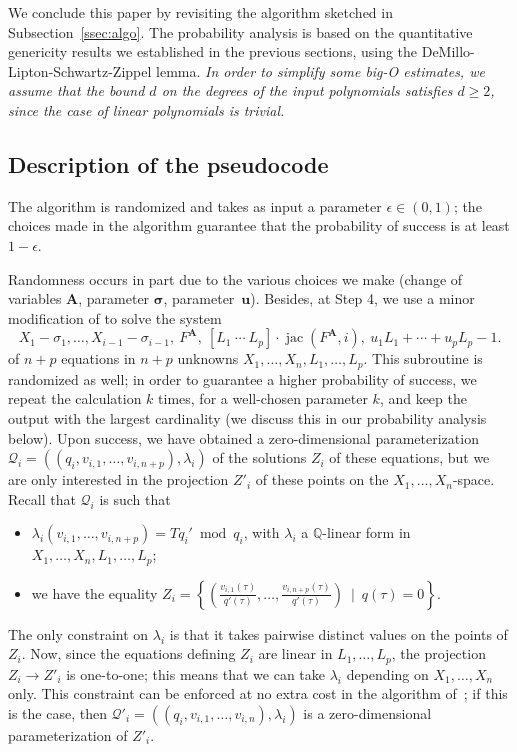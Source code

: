\documentclass[12pt]{article}
\def\scrQ{\ensuremath{\mathscr{Q}}}
\def\mA{{\bm A}}
\DeclareMathOperator{\jac}{jac}
\def\Q{\mathbb{Q}}
\begin{document}
We conclude this paper by revisiting the algorithm sketched in
Subsection~\ref{ssec:algo}. The probability analysis is based on the
quantitative genericity results we established in the previous
sections, using the DeMillo-Lipton-Schwartz-Zippel lemma. {\em In order to
simplify some big-O estimates, we assume that the bound $d$ on the
degrees of the input polynomials satisfies $d \ge 2$, since the case
of linear polynomials is trivial.}


\subsection{Description of the pseudocode}

The algorithm is randomized and takes as input a parameter $\epsilon
\in (0,1)$; the choices made in the algorithm guarantee that the
probability of success is at least $1-\epsilon$. 

Randomness occurs in part due to the various choices we make (change
of variables $\mA$, parameter $\bm \sigma$, parameter~$\bm u$).
Besides, at Step 4, we use a minor modification of \cite[Algorithm
  2]{SH} to solve the system
\[
X_1 - \sigma_1, \dots, X_{i-1} - \sigma_{i-1},\ F^{\mA},\ [L_1~\cdots~L_p]\cdot \jac(F^{\mA}, i),\ u_1 L_1 + \cdots + u_p L_p -1.  
\]
of $n+p$ equations in $n+p$ unknowns
$X_1,\dots,X_n,L_1,\dots,L_p$. This subroutine is randomized as well;
in order to guarantee a higher probability of success, we repeat the
calculation $k$ times, for a well-chosen parameter $k$, and keep the
output with the largest cardinality (we discuss this in our
probability analysis below). Upon success, we have obtained a
zero-dimensional parameterization
$\scrQ_i=((q_i,v_{i,1},\dots,v_{i,n+p}),\lambda_i)$ of the solutions
$Z_i$ of these equations, but we are only interested in the projection
$Z'_i$ of these points on the $X_1,\dots,X_n$-space. Recall that
$\scrQ_i$ is such that
\begin{itemize}
\item $\lambda_i(v_{i,1},\dots,v_{i,n+p})=T q_i' \bmod q_i$, with
  $\lambda_i$ a $\Q$-linear form in $X_1,\dots,X_n,L_1,\dots,L_p$;
\item we have the equality $Z_i=\left \{\left(
  \frac{v_{i,1}(\tau)}{q'(\tau)},\dots,\frac{v_{i,n+p}(\tau)}{q'(\tau)}\right
  ) \ \mid \ q(\tau)=0 \right \}.$
\end{itemize}
The only constraint on $\lambda_i$ is that it takes pairwise distinct
values on the points of $Z_i$. Now, since the equations defining $Z_i$
are linear in $L_1,\dots,L_p$, the projection $Z_i \to Z'_i$ is
one-to-one; this means that we can take $\lambda_i$ depending on
$X_1,\dots,X_n$ only. This constraint can be enforced at no extra cost
in the algorithm of~\cite{SH}; if this is the case, then
$\scrQ'_i=((q_i,v_{i,1},\dots,v_{i,n}),\lambda_i)$ is a
zero-dimensional parameterization of $Z'_i$.
\end{document}
